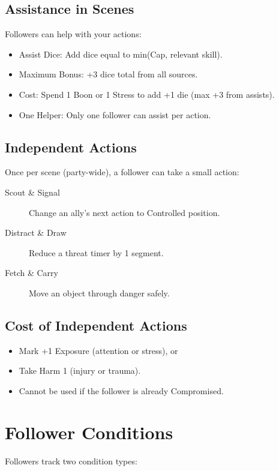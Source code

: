 \documentclass[11pt,twoside,openany]{book}
\begin{document}
\subsection*{Assistance in Scenes}

Followers can help with your actions:
\begin{itemize}
\item Assist Dice: Add dice equal to min(Cap, relevant skill).
\item Maximum Bonus: +3 dice total from all sources.
\item Cost: Spend 1 Boon or 1 Stress to add +1 die (max +3 from assists).
\item One Helper: Only one follower can assist per action.
\end{itemize}

\subsection*{Independent Actions}

Once per scene (party-wide), a follower can take a small action:
\begin{description}
\item[Scout \& Signal] Change an ally's next action to Controlled position.
\item[Distract \& Draw] Reduce a threat timer by 1 segment.
\item[Fetch \& Carry] Move an object through danger safely.
\end{description}

\subsection*{Cost of Independent Actions}

\begin{itemize}
\item Mark +1 Exposure (attention or stress), or
\item Take Harm 1 (injury or trauma).
\item Cannot be used if the follower is already Compromised.
\end{itemize}

\section*{Follower Conditions} 

Followers track two condition types:
\end{document}
